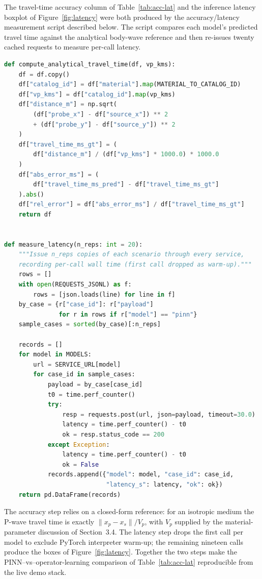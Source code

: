 
The travel-time accuracy column of Table~\ref{tab:acc-lat} and the
inference latency boxplot of Figure~\ref{fig:latency} were both
produced by the accuracy/latency measurement script described below.
The script compares each model's predicted travel time against the
analytical body-wave reference and then re-issues twenty cached
requests to measure per-call latency.

\begin{lstlisting}[language=Python,caption={Accuracy/latency measurement (excerpt)}]
def compute_analytical_travel_time(df, vp_kms):
    df = df.copy()
    df["catalog_id"] = df["material"].map(MATERIAL_TO_CATALOG_ID)
    df["vp_kms"] = df["catalog_id"].map(vp_kms)
    df["distance_m"] = np.sqrt(
        (df["probe_x"] - df["source_x"]) ** 2
        + (df["probe_y"] - df["source_y"]) ** 2
    )
    df["travel_time_ms_gt"] = (
        df["distance_m"] / (df["vp_kms"] * 1000.0) * 1000.0
    )
    df["abs_error_ms"] = (
        df["travel_time_ms_pred"] - df["travel_time_ms_gt"]
    ).abs()
    df["rel_error"] = df["abs_error_ms"] / df["travel_time_ms_gt"]
    return df


def measure_latency(n_reps: int = 20):
    """Issue n_reps copies of each scenario through every service,
    recording per-call wall time (first call dropped as warm-up)."""
    rows = []
    with open(REQUESTS_JSONL) as f:
        rows = [json.loads(line) for line in f]
    by_case = {r["case_id"]: r["payload"]
               for r in rows if r["model"] == "pinn"}
    sample_cases = sorted(by_case)[:n_reps]

    records = []
    for model in MODELS:
        url = SERVICE_URL[model]
        for case_id in sample_cases:
            payload = by_case[case_id]
            t0 = time.perf_counter()
            try:
                resp = requests.post(url, json=payload, timeout=30.0)
                latency = time.perf_counter() - t0
                ok = resp.status_code == 200
            except Exception:
                latency = time.perf_counter() - t0
                ok = False
            records.append({"model": model, "case_id": case_id,
                            "latency_s": latency, "ok": ok})
    return pd.DataFrame(records)
\end{lstlisting}

The accuracy step relies on a closed-form reference: for an isotropic
medium the P-wave travel time is exactly $\lVert x_p - x_s \rVert /
V_p$, with $V_p$ supplied by the material-parameter discussion of
Section~3.4. The
latency step drops the first call per model to exclude PyTorch
interpreter warm-up; the remaining nineteen calls produce the boxes
of Figure~\ref{fig:latency}. Together the two steps make the
PINN--vs--operator-learning comparison of Table~\ref{tab:acc-lat}
reproducible from the live demo stack.
